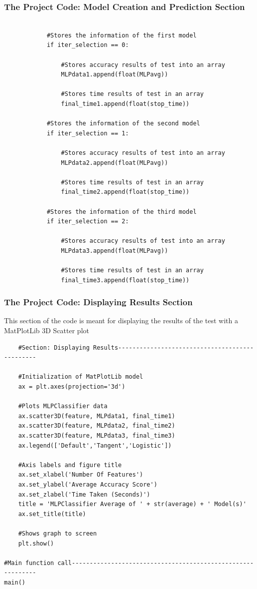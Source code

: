 \documentclass{beamer}
\begin{document}
\begin{frame}[fragile]
\frametitle{The Project Code: Model Creation and Prediction Section}

\fontsize{6}{5}
\begin{verbatim}

            #Stores the information of the first model
            if iter_selection == 0:   
                
                #Stores accuracy results of test into an array
                MLPdata1.append(float(MLPavg))

                #Stores time results of test in an array
                final_time1.append(float(stop_time))

            #Stores the information of the second model
            if iter_selection == 1:

                #Stores accuracy results of test into an array
                MLPdata2.append(float(MLPavg))

                #Stores time results of test in an array
                final_time2.append(float(stop_time))

            #Stores the information of the third model
            if iter_selection == 2:

                #Stores accuracy results of test into an array
                MLPdata3.append(float(MLPavg))

                #Stores time results of test in an array
                final_time3.append(float(stop_time))

\end{verbatim}
\end{frame}

\begin{frame}[fragile]
\frametitle{The Project Code: Displaying Results Section}
\footnotesize
This section of the code is meant for displaying the results of the test with a MatPlotLib 3D Scatter plot
\fontsize{6}{5}
\begin{verbatim}
    #Section: Displaying Results-----------------------------------------------

    #Initialization of MatPlotLib model
    ax = plt.axes(projection='3d')

    #Plots MLPClassifier data
    ax.scatter3D(feature, MLPdata1, final_time1)
    ax.scatter3D(feature, MLPdata2, final_time2)
    ax.scatter3D(feature, MLPdata3, final_time3)
    ax.legend(['Default','Tangent','Logistic'])

    #Axis labels and figure title
    ax.set_xlabel('Number Of Features')
    ax.set_ylabel('Average Accuracy Score')
    ax.set_zlabel('Time Taken (Seconds)')
    title = 'MLPClassifier Average of ' + str(average) + ' Model(s)'
    ax.set_title(title)

    #Shows graph to screen
    plt.show()
    
#Main function call------------------------------------------------------------
main()
\end{verbatim}
\end{frame}
\end{document}
